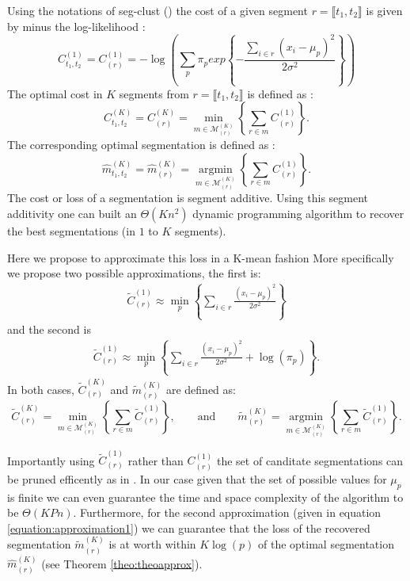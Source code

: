 \documentclass[article,10pt]{llncs}
\begin{document}
Using the notations of seg-clust (\cite{picard_2007}) the cost of a given segment $r = \llbracket t_1, t_2 \rrbracket$ is given by minus the log-likelihood :
$$ C_{t_1, t_2}^{(1)} =C_{(r)}^{(1)} = -\log\left(\sum_p \pi_p exp\left\{ - \frac{\sum_{i \in r} (x_i - \mu_p)^2 }{ 2 \sigma^2} \right\}\right)$$ 
The optimal cost in $K$ segments from $r = \llbracket t_1, t_2 \rrbracket$ is defined as :
$$C_{t_1, t_2}^{(K)} = C_{(r)}^{(K)} = \min_{m \in \mathcal{M}^{(K)}_{(r)}} \left\{ \sum_{r \in m} C^{(1)}_{(r)} \right\}.$$
The corresponding  optimal segmentation is defined as :
$$\widehat{m}_{t_1, t_2}^{(K)} = \widehat{m}_{(r)}^{(K)} = \underset{m \in \mathcal{M}^{(K)}_{(r)}}{\operatorname{argmin}} \left\{ \sum_{r \in m} C^{(1)}_{(r)} \right\}.$$
The cost or loss of a segmentation is segment additive. Using this segment additivity one can built an $\Theta(Kn^2)$ dynamic programming algorithm to recover the best segmentations (in $1$ to $K$ segments).
 

Here we propose to approximate this loss in a K-mean fashion
More specifically we propose two possible approximations, the first is:
\begin{eqnarray} \widetilde{C}_{(r)}^{(1)} \approx  \min_p \left\{ \sum_{i \in r}\frac{(x_i - \mu_p)^2} {2\sigma^2 }\right\}
\label{equation:approximation2}\end{eqnarray} 
and the second is 
\begin{eqnarray} \widetilde{C}_{(r)}^{(1)} \approx  \min_p \left\{ \sum_{i \in r}\frac{(x_i - \mu_p)^2} {2\sigma^2 } + \log(\pi_p)\right\} .
\label{equation:approximation1}\end{eqnarray} 
In both cases, $\widetilde{C}_{(r)}^{(K)}$ and $\widetilde{m}_{(r)}^{(K)}$ are defined as:
$$ \widetilde{C}_{(r)}^{(K)} =\min_{m \in \mathcal{M}^{(K)}_{(r)}} \left\{ \sum_{r \in m} \widetilde{C}^{(1)}_{(r)} \right\}, \qquad \text{and} \qquad
 \widetilde{m}_{(r)}^{(K)} = \underset{m \in \mathcal{M}^{(K)}_{(r)}}{\operatorname{argmin}} \left\{ \sum_{r \in m} \widetilde{C}^{(1)}_{(r)} \right\}.$$


Importantly using $\widetilde{C}_{(r)}^{(1)}$ rather than  ${C}_{(r)}^{(1)}$ the set of canditate segmentations can be pruned efficently as in \cite{rigaill_2010}. 
In our case given that the set of possible values for $\mu_p$ is finite we can even guarantee the time and space complexity of the algorithm to be $\Theta(KPn)$. 
Furthermore, for the second approximation (given in equation \ref{equation:approximation1}) we can guarantee that the loss of the recovered segmentation $\widetilde{m}_{(r)}^{(K)}$ is at worth within $K \log(p)$ of the optimal segmentation $\widehat{m}_{(r)}^{(K)}$ (see Theorem \ref{theo:theoapprox}).
\end{document}
